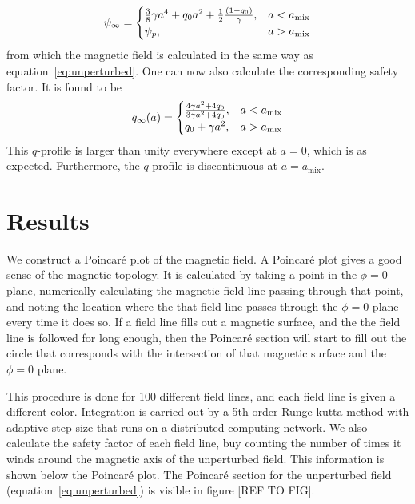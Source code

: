 \documentclass[%
superscriptaddress,
amsmath,amssymb,
aps,
pre,
floatfix,
]{revtex4-2}
\begin{document}
\begin{equation}
    \psi_\infty = \begin{cases}
    \frac{3}{8} \gamma a^4 + q_0 a^2 + \frac{1}{2}  \frac{( 1 - q_0  )}{\gamma} , & a<a_{\rm mix} \\
    \psi_p, & a> a_{\rm mix}
    \end{cases}
\end{equation}
from which the magnetic field is calculated in the same way as equation~\eqref{eq:unperturbed}.
One can now also calculate the corresponding safety factor. It is found to be
\begin{equation}
    q_\infty(a) = \begin{cases} 
    \frac{4 \gamma a^2 + 4 q_0}{3 \gamma a^2 + 4 q_0}, & a<a_{\rm mix} \\
    q_0 + \gamma a^2, & a>a_{\rm mix}
    \end{cases}
\end{equation}
This $q$-profile is larger than unity everywhere except at $a=0$, which is as expected. Furthermore, the $q$-profile is discontinuous at $a=a_{\text{mix}}$.


\section{Results}
We construct a Poincar\'e plot of the magnetic field. 
A Poincar\'e plot gives a good sense of the magnetic topology. 
It is calculated by taking a point in the $\phi=0$ plane, numerically calculating the magnetic field line passing through that point, and noting the location where the that field line passes through the $\phi=0$ plane every time it does so. 
If a field line fills out a magnetic surface, and the the field line is followed for long enough, then the Poincar\'e section will start to fill out the circle that corresponds with the intersection of that magnetic surface and the $\phi=0$ plane. 


This procedure is done for 100 different field lines, and each field line is given a different color.
Integration is carried out by a 5th order Runge-kutta method with adaptive step size that runs on a distributed computing network. 
We also calculate the safety factor of each field line, buy counting the number of times it winds around the magnetic axis of the unperturbed field. 
This information is shown below the Poincar\'e plot. 
The Poincar\'e section for the unperturbed field (equation~\eqref{eq:unperturbed}) is visible in figure [REF TO FIG]. 
\end{document}
